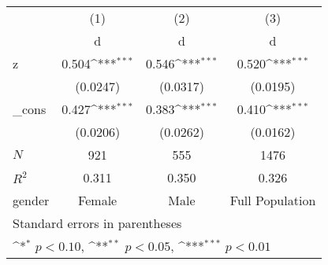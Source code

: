 {
\def\sym#1{\ifmmode^{#1}\else\(^{#1}\)\fi}
\begin{tabular}{l*{3}{c}}
\hline\hline
            &\multicolumn{1}{c}{(1)}&\multicolumn{1}{c}{(2)}&\multicolumn{1}{c}{(3)}\\
            &\multicolumn{1}{c}{d}&\multicolumn{1}{c}{d}&\multicolumn{1}{c}{d}\\
\hline
z           &       0.504\sym{***}&       0.546\sym{***}&       0.520\sym{***}\\
            &    (0.0247)         &    (0.0317)         &    (0.0195)         \\
[1em]
\_cons      &       0.427\sym{***}&       0.383\sym{***}&       0.410\sym{***}\\
            &    (0.0206)         &    (0.0262)         &    (0.0162)         \\
\hline
\(N\)       &         921         &         555         &        1476         \\
\(R^{2}\)   &       0.311         &       0.350         &       0.326         \\
gender      &      Female         &        Male         &Full Population         \\
\hline\hline
\multicolumn{4}{l}{\footnotesize Standard errors in parentheses}\\
\multicolumn{4}{l}{\footnotesize \sym{*} \(p<0.10\), \sym{**} \(p<0.05\), \sym{***} \(p<0.01\)}\\
\end{tabular}
}
